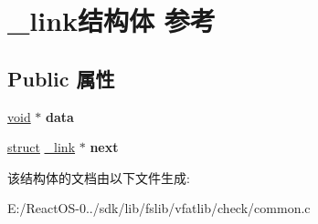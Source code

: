 \hypertarget{struct__link}{}\section{\+\_\+link结构体 参考}
\label{struct__link}
\subsection*{Public 属性}
\begin{DoxyCompactItemize}
\item 
\mbox{\label{struct__link_af6484081923163071acfe0550a6cd5a1}} 
\hyperlink{interfacevoid}{void} $\ast$ {\bfseries data}
\item 
\mbox{\label{struct__link_a4a706ed5b4beefad3bc35cb3354f08f0}} 
\hyperlink{interfacestruct}{struct} \hyperlink{struct__link}{\+\_\+link} $\ast$ {\bfseries next}
\end{DoxyCompactItemize}


该结构体的文档由以下文件生成\+:\begin{DoxyCompactItemize}
\item 
E\+:/\+React\+O\+S-\/0../sdk/lib/fslib/vfatlib/check/common.\+c\end{DoxyCompactItemize}

